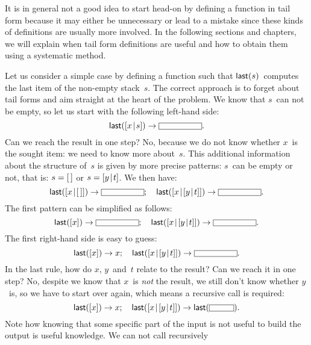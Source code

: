 It is in general not a good idea to start head\hyp{}on by defining a
function in tail form because it may either be unnecessary or lead to
a mistake since these kinds of definitions are usually more
involved. In the following sections and chapters, we will explain when
tail form definitions are useful and how to obtain them using a
systematic method.

Let us consider a simple case by defining a function  such
that \(\textsf{last}(s)\)~computes the last item of the non\hyp{}empty
stack~\(s\). The correct approach is to forget about tail forms and
aim straight at the heart of the problem. We know that \(s\)~can not
be empty, so let us start with the following left\hyp{}hand side:
\begin{equation*}
\fun{last}(\cons{x}{s}) \rightarrow \fbcode{CCCCCCC}.
\end{equation*}
Can we reach the result in one step? No, because we do not know
whether \(x\)~is the sought item: we need to know more
about~\(s\). This additional information about the structure of~\(s\)
is given by more precise patterns: \(s\)~can be empty or not, that is:
\(s = [\,]\) or \(s=[{y}\!\mid\!{t}]\). We then have:
\begin{equation*}
\fun{last}(\cons{x}{\el}) \rightarrow \fbcode{CCCCCCC};\quad
\fun{last}(\cons{x}{\cons{y}{t}}) \rightarrow \fbcode{CCCCCCC}.
\end{equation*}
The first pattern can be simplified as follows:
\begin{equation*}
\fun{last}([x]) \rightarrow \fbcode{CCCCCCC};\quad
\fun{last}(\cons{x}{\cons{y}{t}}) \rightarrow \fbcode{CCCCCCC}.
\end{equation*}
The first right\hyp{}hand side is easy to guess:
\begin{equation*}
\fun{last}([x]) \rightarrow x;\quad
\fun{last}(\cons{x}{\cons{y}{t}}) \rightarrow \fbcode{CCCCCCC}.
\end{equation*}
In the last rule, how do \(x\), \(y\)~and~\(t\) relate to the result?
Can we reach it in one step? No, despite we know that \(x\)~is
\emph{not} the result, we still don't know whether \(y\)~is, so we
have to start over again, which means a recursive call is required:
\begin{equation*}
\fun{last}([x]) \rightarrow x;\quad
\fun{last}(\cons{x}{\cons{y}{t}}) \rightarrow
  \fun{last}(\fbcode{CCCC}).
\end{equation*}
Note how knowing that some specific part of the input is not useful to
build the output is useful knowledge. We can not call recursively
